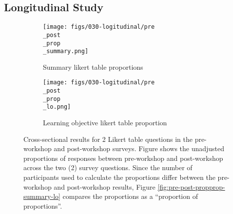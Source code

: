 \documentclass[030-workshop.tex]{subfiles}
\begin{document}
\subsection{Longitudinal Study}
\label{sse:longitudinal-study}

\begin{figure}[!hbtp]
  \centering
  \begin{subfigure}[h]{0.45\textwidth}
      \centering
      \texttt{[image: figs/030-logitudinal/pre\\\_post\\\_prop\\\_summary.png]}
      \caption[Proportion of summary Likert table results]
      {Summary likert table proportions}
      \label{sfig:pre-post-prop-summary}
  \end{subfigure}
  \hfill
  \begin{subfigure}[h]{0.45\textwidth}
      \centering
      \texttt{[image: figs/030-logitudinal/pre\\\_post\\\_prop\\\_lo.png]}
      \caption[Proportion of learning objective Likert table results]
      {Learning objective likert table proportion}
      \label{sfig:pre-post-prop-lo}
  \end{subfigure}
  \caption[Summary table and learning objective Likert proportion (pre, post)]
  {Cross-sectional results for 2 Likert table questions in the
      pre-workshop and post-workshop surveys.
      Figure shows the unadjusted proportions of responses between pre-workshop and post-workshop
      across the two (2) survey questions.
      Since the number of participants used to calculate the proportions differ between the pre-workshop and post-workshop results,
      Figure \ref{fig:pre-post-propprop-summary-lo} compares the proportions as a ``proportion of proportions''.
  }
  \label{fig:pre-post-prop-summary-lo}
\end{figure}
\end{document}
